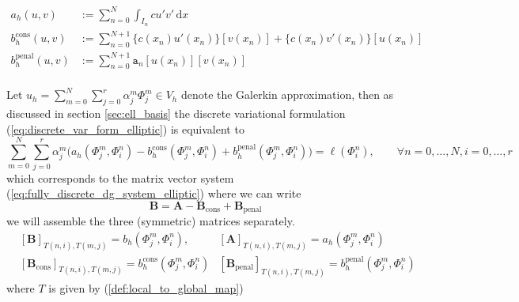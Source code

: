 \begin{align*}
    a_h(u,v) & := \sum_{n=0}^N \int_{I_n} cu'v'\, \text{d}x \\
    b_h^{\text{cons}}(u,v) & := \sum_{n=0}^{N+1} \{c(x_n)u'(x_n)\}[v(x_n)] + \{c(x_n)v'(x_n)\}[u(x_n)] \\
    b_h^{\text{penal}}(u,v) &:= \sum_{n=0}^{N+1} \texttt{a}_n[u(x_n)][v(x_n)] \\
\end{align*}

Let $\displaystyle u_h = \sum_{m=0}^{N} \sum_{j=0}^{r} \alpha_j^m \Phi_j^m \in V_h$ denote
the Galerkin approximation, then as discussed in section \ref{sec:ell_basis} the discrete variational formulation (\ref{eq:discrete_var_form_elliptic}) is equivalent 
to 
\begin{equation}
    \sum_{m=0}^{N} \sum_{j=0}^{r} \alpha_j^m \Big(
    a_h(\Phi_j^m,\Phi_i^n) - b_h^{\text{cons}}(\Phi_j^m,\Phi_i^n) + b_h^{\text{penal}}(\Phi_j^m,\Phi_i^n)
    \Big)
    = \ell(\Phi_i^n), \qquad \forall n=0,\ldots,N, i=0,\ldots,r
\end{equation}
which corresponds to the matrix vector system (\ref{eq:fully_discrete_dg_system_elliptic}) 
where we can write 
\begin{equation*}
    \textbf{B} = \textbf{A} - \textbf{B}_{\text{cons}} + \textbf{B}_{\text{penal}} 
\end{equation*}
we will assemble the three (symmetric) matrices separately. 
\begin{align*}
    &[\textbf{B}]_{T(n,i),T(m,j)} = b_h(\Phi_j^m, \Phi_i^n),
    &[\textbf{A}]_{T(n,i),T(m,j)} = a_h(\Phi_j^m, \Phi_i^n) \\
    &[\textbf{B}_{\text{cons}}]_{T(n,i),T(m,j)} = b_h^{\text{cons}} (\Phi_j^m, \Phi_i^n)
    &[\textbf{B}_{\text{penal}}]_{T(n,i),T(m,j)} = b_h^{\text{penal}} (\Phi_j^m, \Phi_i^n)
\end{align*}
where $T$ is given by (\ref{def:local_to_global_map})


